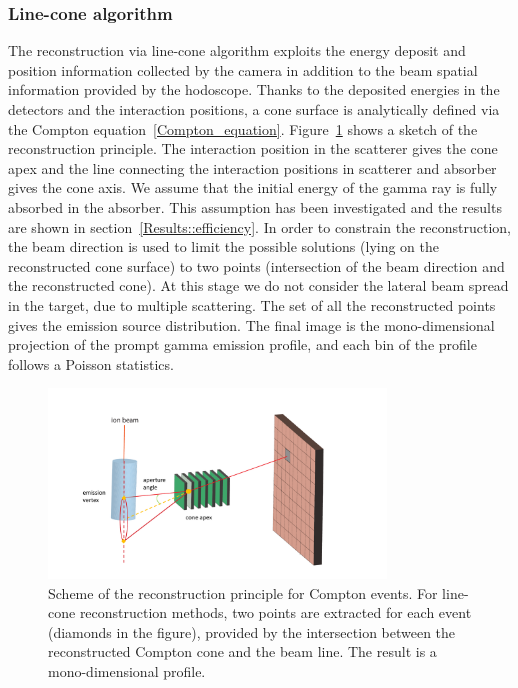 \subsubsection{Line-cone algorithm}
The reconstruction via line-cone algorithm exploits the energy deposit and position information collected by the camera in addition to the beam spatial information provided by the hodoscope. Thanks to the deposited energies in the detectors and the interaction positions, a cone surface is analytically defined via the Compton equation~\ref{Compton_equation}. Figure~\ref{fig:reconstruction_scheme} shows a sketch of the reconstruction principle. The interaction position in the scatterer gives the cone apex and the line connecting the interaction positions in scatterer and absorber gives the cone axis. We assume that the initial energy of the gamma ray is fully absorbed in the absorber. This assumption has been investigated and the results are shown in section~\ref{Results::efficiency}. In order to constrain the reconstruction, the beam direction is used to limit the possible solutions (lying on the reconstructed cone surface) to two points (intersection of the beam direction and the reconstructed cone). At this stage we do not consider the lateral beam spread in the target, due to multiple scattering. The set of all the reconstructed points gives the emission source distribution. The final image is the mono-dimensional projection of the prompt gamma emission profile, and each bin of the profile follows a Poisson statistics. 

\begin{figure}
\centering
  \includegraphics[width=0.8\textwidth]{./Figure/reconstruction_scheme}
  \caption{Scheme of the reconstruction principle for Compton events. For line-cone reconstruction methods, two points are extracted for each event (diamonds in the figure), provided by the intersection between the reconstructed Compton cone and the beam line. The result is a mono-dimensional profile.}	
  \label{fig:reconstruction_scheme}
\end{figure}

